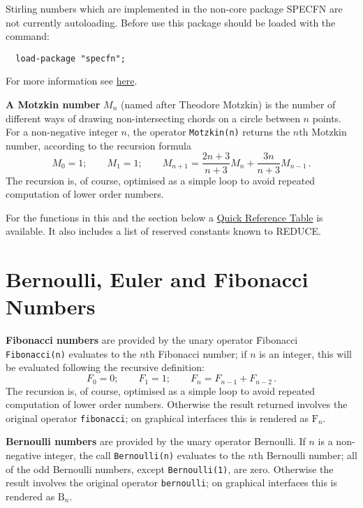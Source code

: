 Stirling numbers which are implemented in the non-core package SPECFN are
not currently autoloading. Before use this package should be loaded with the
command:
\begin{verbatim}
  load-package "specfn";
\end{verbatim}
For more information see \hyperlink{STIRL}{here}.

\hypertarget{operator:MOTZKIN}{}
\textbf{A Motzkin number} $M_{n}$ (named after Theodore Motzkin) is the
number of different ways of drawing non-intersecting chords on a circle between
$n$ points. For a non-negative integer $n$, the operator \texttt{Motzkin(n)} 
returns the $n$th Motzkin number, according to the recursion formula
\begin{displaymath}
  M_{0} = 1; \qquad M_{1}=1; \qquad
  M_{n+1} = \frac{2n+3}{n+3}M_{n}+ \frac{3n}{n+3}M_{n-1}\,.
\end{displaymath}
The recursion is, of course, optimised as a simple loop to avoid repeated
computation of lower order numbers.

For the functions in this and the section below
a \hyperlink{SPECFNTAB5}{Quick Reference Table} is available.
It also includes a list of reserved constants known to REDUCE.

\section{Bernoulli, Euler and Fibonacci Numbers}
\hypertarget{operator:FIBONACCI}{}
\textbf{Fibonacci numbers} are provided by the unary operator \f{Fibonacci}
\texttt{Fibonacci(n)} evaluates to the $n$th Fibonacci
number; if $n$ is an integer, this will be evaluated following
the recursive definition:
$$F_0 = 0; \qquad F_1 = 1;\qquad F_n = F_{n-1} + F_{n-2}\,.$$
The recursion is, of course, optimised as a simple loop to avoid repeated
computation of lower order numbers.
Otherwise the result returned involves the original operator
\texttt{fibonacci}; on graphical interfaces this is rendered
as $\mathrm{F}_n$.

\hypertarget{operator:BERNOULLI}{}
\textbf{Bernoulli numbers} are provided by the unary operator
\f{Bernoulli}. If $n$ is a non-negative integer, the call \texttt{Bernoulli(n)}
evaluates to the $n$th Bernoulli number; all of the odd Bernoulli numbers,
except \texttt{Bernoulli(1)}, are zero. Otherwise the result involves the
original operator \texttt{bernoulli}; on graphical interfaces this is rendered
as $\mathrm{B}_n$.

